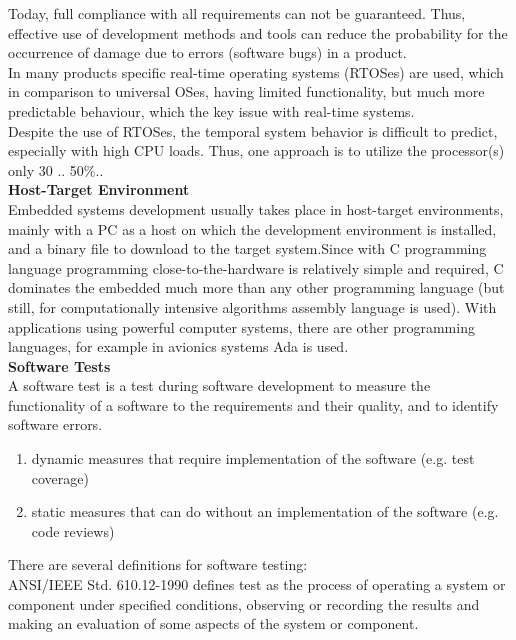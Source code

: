 Today, full compliance with all requirements can not be guaranteed. Thus, effective use of development methods and tools can reduce the probability for the occurrence of damage due to errors (software bugs) in a product.\\

In many products specific real-time operating systems (RTOSes) are used, which in comparison to universal OSes, having limited functionality, but much more predictable behaviour, which the key issue with real-time systems.\\

Despite the use of RTOSes, the temporal system behavior is difficult to predict, especially with high CPU loads. Thus, one approach is to utilize the processor(s) only 30 .. 50\%..\\

\textbf{Host-Target Environment}\\

Embedded systems development usually takes place in host-target environments, mainly with a PC as a host on which the development environment is installed, and a binary file to download to the target system.Since with C programming language programming close-to-the-hardware is relatively simple and required, C dominates the embedded much more than any other programming language (but still, for computationally intensive algorithms assembly language is used). With applications using powerful computer systems, there are other programming languages, for example in avionics systems Ada is used.\\

\textbf{Software Tests}\\

A software test is a test during software development to measure the functionality of a software to the requirements and their quality, and to identify software errors.

\begin{enumerate}
\item  dynamic measures that require implementation of the software (e.g. test coverage)
\item  static measures that can do without an implementation of the software (e.g. code reviews)
\end{enumerate}

There are several definitions for software testing:\\

ANSI/IEEE Std. 610.12-1990 defines test as the process of operating a system or component under specified conditions, observing or recording the results and making an evaluation of some aspects of the system or component.\\

